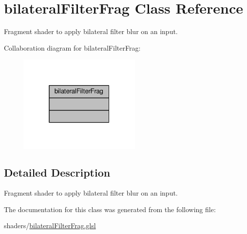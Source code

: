 \hypertarget{classbilateral_filter_frag}{\section{bilateral\-Filter\-Frag Class Reference}
\label{classbilateral_filter_frag}
}


Fragment shader to apply bilateral filter blur on an input.  




Collaboration diagram for bilateral\-Filter\-Frag\-:\nopagebreak
\begin{figure}[H]
\begin{center}
\leavevmode
\includegraphics[width=172pt]{classbilateral_filter_frag__coll__graph}
\end{center}
\end{figure}


\subsection{Detailed Description}
Fragment shader to apply bilateral filter blur on an input. 

The documentation for this class was generated from the following file\-:\begin{DoxyCompactItemize}
\item 
shaders/\hyperlink{bilateral_filter_frag_8glsl}{bilateral\-Filter\-Frag.\-glsl}\end{DoxyCompactItemize}
